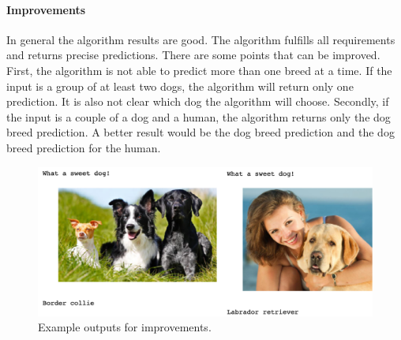 \documentclass{article}
\begin{document}
\paragraph{Improvements} In general the algorithm results are good. The algorithm fulfills all requirements and returns precise predictions. There are some points that can be improved.\newline
First, the algorithm is not able to predict more than one breed at a time. If the input is a group of at least two dogs, the algorithm will return only one prediction. It is also not clear which dog the algorithm will choose.\newline
Secondly, if the input is a couple of a dog and a human, the algorithm returns only the dog breed prediction. A better result would be the dog breed prediction and the dog breed prediction for the human.
\begin{figure}[H]
    \centering
    \includegraphics[scale=0.25]{./images/algorithm_improvements}
    \caption{Example outputs for improvements.}
    \label{fig:algorithm_improvements}
\end{figure}



\end{document}
